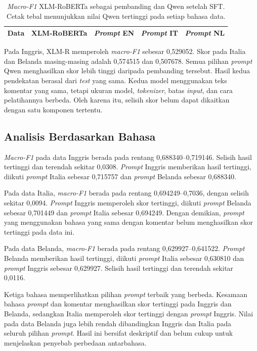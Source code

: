 \documentclass[11pt]{article}
\begin{document}
\begin{table}[t]
\centering
\small
\setlength{\tabcolsep}{3pt}
\begin{tabular}{lrrrr}
\toprule
Data & XLM-RoBERTa & \textit{Prompt} EN & \textit{Prompt} IT & \textit{Prompt} NL \\
\midrule

\end{tabular}
\caption{\textit{Macro-F1} XLM-RoBERTa sebagai pembanding dan Qwen setelah SFT. Cetak tebal menunjukkan nilai Qwen tertinggi pada setiap bahasa data.}
\label{tab:main}
\end{table}

Pada Inggris, XLM-R memperoleh \textit{macro-F1} sebesar 0,529052. Skor pada Italia dan Belanda masing-masing adalah 0,574515 dan 0,507678. Semua pilihan \textit{prompt} Qwen menghasilkan skor lebih tinggi daripada pembanding tersebut. Hasil kedua pendekatan berasal dari \textit{test} yang sama. Kedua model menggunakan teks komentar yang sama, tetapi ukuran model, \textit{tokenizer}, batas \textit{input}, dan cara pelatihannya berbeda. Oleh karena itu, selisih skor belum dapat dikaitkan dengan satu komponen tertentu.

\subsection{Analisis Berdasarkan Bahasa}
\textit{Macro-F1} pada data Inggris berada pada rentang 0,688340--0,719146. Selisih hasil tertinggi dan terendah sekitar 0,0308. \textit{Prompt} Inggris memberikan hasil tertinggi, diikuti \textit{prompt} Italia sebesar 0,715757 dan \textit{prompt} Belanda sebesar 0,688340.

Pada data Italia, \textit{macro-F1} berada pada rentang 0,694249--0,7036, dengan selisih sekitar 0,0094. \textit{Prompt} Inggris memperoleh skor tertinggi, diikuti \textit{prompt} Belanda sebesar 0,701449 dan \textit{prompt} Italia sebesar 0,694249. Dengan demikian, \textit{prompt} yang menggunakan bahasa yang sama dengan komentar belum menghasilkan skor tertinggi pada data ini.

Pada data Belanda, \textit{macro-F1} berada pada rentang 0,629927--0,641522. \textit{Prompt} Belanda memberikan hasil tertinggi, diikuti \textit{prompt} Italia sebesar 0,630810 dan \textit{prompt} Inggris sebesar 0,629927. Selisih hasil tertinggi dan terendah sekitar 0,0116.

Ketiga bahasa memperlihatkan pilihan \textit{prompt} terbaik yang berbeda. Kesamaan bahasa \textit{prompt} dan komentar menghasilkan skor tertinggi pada Inggris dan Belanda, sedangkan Italia memperoleh skor tertinggi dengan \textit{prompt} Inggris. Nilai pada data Belanda juga lebih rendah dibandingkan Inggris dan Italia pada seluruh pilihan \textit{prompt}. Hasil ini bersifat deskriptif dan belum cukup untuk menjelaskan penyebab perbedaan antarbahasa.
\end{document}
